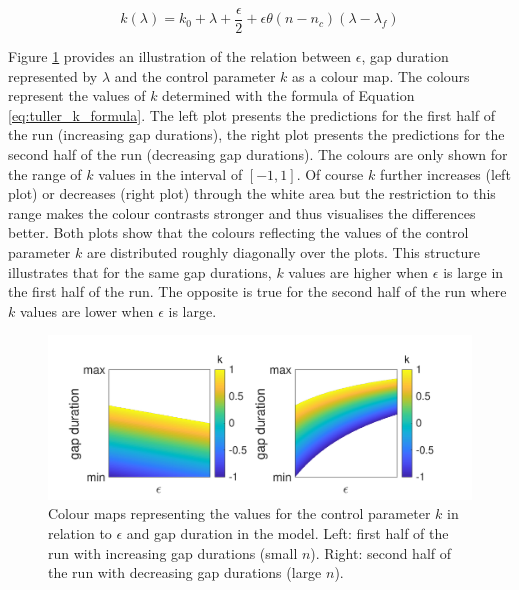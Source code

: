 \begin{equation}
k(\lambda) = k_0 + \lambda + \frac{\epsilon}{2} + \epsilon\theta(n-n_c)(\lambda-\lambda_f)
\label{eq:tuller_k_formula}
\end{equation}

Figure \ref{fig:tuller_colour_map} provides an illustration of the relation between $\epsilon$, gap duration represented by $\lambda$ and the control parameter $k$ as a colour map. The colours represent the values of $k$ determined with the formula of Equation \ref{eq:tuller_k_formula}. The left plot presents the predictions for the first half of the run (increasing gap durations), the right plot presents the predictions for the second half of the run (decreasing gap durations). The colours are only shown for the range of $k$ values in the interval of $[-1, 1]$. Of course $k$ further increases (left plot) or decreases (right plot) through the white area but the restriction to this range makes the colour contrasts stronger and thus visualises the differences better. Both plots show that the colours reflecting the values of the control parameter $k$ are distributed roughly diagonally over the plots. This structure illustrates that for the same gap durations, $k$ values are higher when $\epsilon$ is large in the first half of the run. The opposite is true for the second half of the run where $k$ values are lower when $\epsilon$ is large. 

\begin{figure}[h]
\begin{center}
\includegraphics[width=12cm]{figures/ch3/tuller_map.pdf}
\caption[Colour maps representing the values for the control parameter $k$ in relation to $\epsilon$ and gap duration in the \citet{Tulleretal1994} model.]{Colour maps representing the values for the control parameter $k$ in relation to $\epsilon$ and gap duration in the \citet{Tulleretal1994} model. Left: first half of the run with increasing gap durations (small $n$). Right: second half of the run with decreasing gap durations (large $n$).}
\label{fig:tuller_colour_map}
\end{center}
\end{figure}


